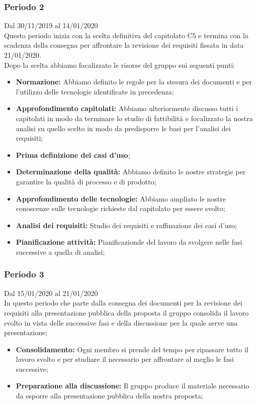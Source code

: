 \subsubsection{Periodo 2} 
Dal 30/11/2019 al 14/01/2020\\
Questo periodo inizia con la scelta definitiva del capitolato C5 e termina con la scadenza della consegna per affrontare la revisione dei requisiti fissata in data 21/01/2020.\\
Dopo la scelta abbiamo focalizzato le risorse del gruppo sui seguenti punti:
\begin{itemize}
	\item \textbf{Normazione: }Abbiamo definito le regole per la stesura dei documenti e per l'utilizzo delle tecnologie identificate in precedenza;
	\item \textbf{Approfondimento capitolati: }Abbiamo ulteriormente discusso tutti i capitolati in modo da terminare lo studio di fattibilità e focalizzato la nostra analisi su quello scelto in modo da predisporre le basi per l'analisi dei requisiti;
	\item \textbf{Prima definizione dei casi d'uso};
	\item \textbf{Determinazione della qualità: }Abbiamo definito le nostre strategie per garantire la qualità di processo e di prodotto;
	\item \textbf{Approfondimento delle tecnologie: }Abbiamo ampliato le nostre conoscenze sulle tecnologie richieste dal capitolato per essere svolto;
	\item \textbf{Analisi dei requisiti: }Studio dei requisiti e raffinazione dei casi d'uso;
	\item \textbf{Pianificazione attività: }Pianificazionde del lavoro da svolgere nelle fasi successive a quella di analisi;
\end{itemize}
\subsubsection{Periodo 3} 
Dal 15/01/2020 al 21/01/2020\\
In questo periodo che parte dalla consegna dei documenti per la revisione dei requisiti alla presentazione pubblica della proposta il gruppo consolida il lavoro svolto in vista delle successive fasi e della discussione per la quale serve una presentazione;
\begin{itemize}
	\item \textbf{Consolidamento:} Ogni membro si prende del tempo per ripassare tutto il lavoro svolto e per studiare il necessario per affrontare al meglio le fasi successive;
	\item \textbf{Preparazione alla discussione:} Il gruppo produce il materiale necessario da esporre alla presentazione pubblica della nostra proposta;
\end{itemize}
